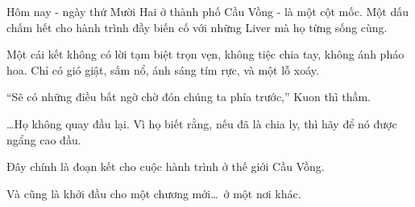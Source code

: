 \documentclass[../main.tex]{subfiles}
\begin{document}
Hôm nay - ngày thứ Mười Hai ở thành phố Cầu Vồng - là một cột mốc. Một dấu chấm hết cho hành trình đầy biến cố với những Liver mà họ từng sống cùng.

Một cái kết không có lời tạm biệt trọn vẹn, không tiệc chia tay, không ánh pháo hoa. Chỉ có gió giật, sấm nổ, ánh sáng tím rực, và một lỗ xoáy.

``Sẽ có những điều bất ngờ chờ đón chúng ta phía trước,'' Kuon thì thầm.

\dots Họ không quay đầu lại. Vì họ biết rằng, nếu đã là chia ly, thì hãy để nó được ngẩng cao đầu.

Đây chính là đoạn kết cho cuộc hành trình ở thế giới Cầu Vồng.

Và cũng là khởi đầu cho một chương mới\dots\ ở một nơi khác.
\end{document}
